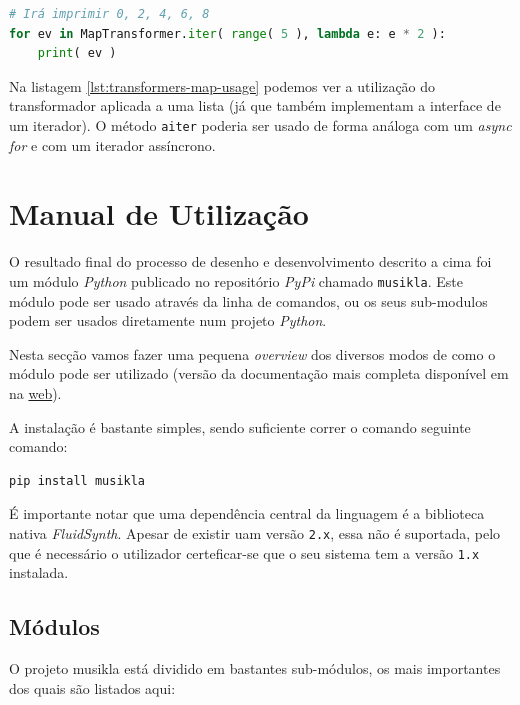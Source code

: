 \begin{lstlisting}[caption={Exemplo de um transformador \texttt{map} e da sua utilização},label={lst:transformers-map-usage},language=Python]
# Irá imprimir 0, 2, 4, 6, 8
for ev in MapTransformer.iter( range( 5 ), lambda e: e * 2 ):
    print( ev )
\end{lstlisting}

Na listagem \ref{lst:transformers-map-usage} podemos ver a utilização do transformador aplicada a uma lista (já que também implementam a interface de um iterador). O método \texttt{aiter} poderia ser usado de forma análoga com um \textit{async for} e com um iterador assíncrono.

\chapter{Manual de Utilização}
O resultado final do processo de desenho e desenvolvimento descrito a cima foi um módulo \textit{Python} publicado no repositório \textit{PyPi} chamado \texttt{musikla}. Este módulo pode ser usado através da linha de comandos, ou os seus sub-modulos podem ser usados diretamente num projeto \textit{Python}.

Nesta secção vamos fazer uma pequena \textit{overview} dos diversos modos de como o módulo pode ser utilizado (versão da documentação mais completa disponível em na \href{https://github.com/pedromsilvapt/miei-dissertation}{web}).

A instalação é bastante simples, sendo suficiente correr o comando seguinte comando:

\begin{lstlisting}[caption={Processo de instalação do \textit{package} musikla},label={lst:install-musikla},language=Bash]
pip install musikla
\end{lstlisting}

É importante notar que uma dependência central da linguagem é a biblioteca nativa \textit{FluidSynth}. Apesar de existir uam versão \texttt{2.x}, essa não é suportada, pelo que é necessário o utilizador certeficar-se que o seu sistema tem a versão \texttt{1.x} instalada.

\section{Módulos}
O projeto musikla está dividido em bastantes sub-módulos, os mais importantes dos quais são listados aqui:

